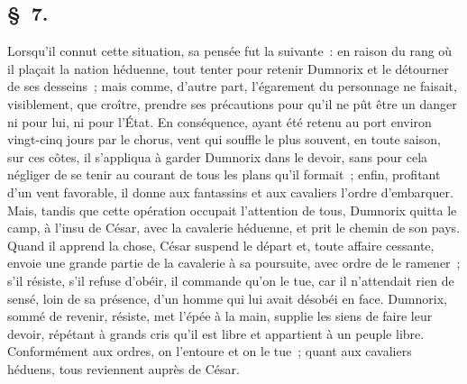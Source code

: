 \documentclass[french,twoside]{book} %
\begin{document}
\subsection[{§ 7.}]{ \textsc{§ 7.} }
\noindent Lorsqu’il connut cette situation, sa pensée fut la suivante : en raison du rang où il plaçait la nation héduenne, tout tenter pour retenir Dumnorix et le détourner de ses desseins ; mais comme, d’autre part, l’égarement du personnage ne faisait, visiblement, que croître, prendre ses précautions pour qu’il ne pût être un danger ni pour lui, ni pour l’État. En conséquence, ayant été retenu au port environ vingt-cinq jours par le chorus, vent qui souffle le plus souvent, en toute saison, sur ces côtes, il s’appliqua à garder Dumnorix dans le devoir, sans pour cela négliger de se tenir au courant de tous les plans qu’il formait ; enfin, profitant d’un vent favorable, il donne aux fantassins et aux cavaliers l’ordre d’embarquer. Mais, tandis que cette opération occupait l’attention de tous, Dumnorix quitta le camp, à l’insu de César, avec la cavalerie héduenne, et prit le chemin de son pays. Quand il apprend la chose, César suspend le départ et, toute affaire cessante, envoie une grande partie de la cavalerie à sa poursuite, avec ordre de le ramener ; s’il résiste, s’il refuse d’obéir, il commande qu’on le tue, car il n’attendait rien de sensé, loin de sa présence, d’un homme qui lui avait désobéi en face. Dumnorix, sommé de revenir, résiste, met l’épée à la main, supplie les siens de faire leur devoir, répétant à grands cris qu’il est libre et appartient à un peuple libre. Conformément aux ordres, on l’entoure et on le tue ; quant aux cavaliers héduens, tous reviennent auprès de César.
\end{document}
